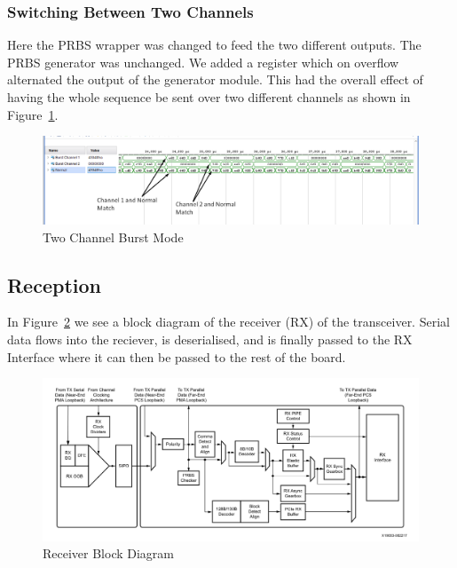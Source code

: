 \subsubsection{Switching Between Two Channels}%
\label{ssub:switching_between_two_channels}
Here the PRBS wrapper was changed to feed the two different outputs. The PRBS
generator was unchanged. We added a register which on overflow alternated the
output of the generator module. 
This had the overall effect of having the whole sequence be sent over two
different channels as shown in Figure~\ref{fig:two_channel_tx}.

\begin{figure}[ht]
    \centering
    \hspace*{-3cm}\includegraphics[width=1.4\linewidth]{img/two_channel.png}
    \caption{Two Channel Burst Mode}%
    \label{fig:two_channel_tx}
\end{figure}

\subsection{Reception}%
\label{sub:reception}
In Figure~\ref{fig:receiver_block} we see a block diagram of the receiver
(RX) of the transceiver. Serial data flows into the reciever, is deserialised,
and is finally passed to the RX Interface where it can then be passed to the
rest of the board.
\begin{figure}[ht]
    \centering
    \hspace*{-1cm}\includegraphics[width=1.2\linewidth]{img/receiver_block.png}
    \caption{Receiver Block Diagram \cite{GTY_guide}}%
    \label{fig:receiver_block}
\end{figure}

